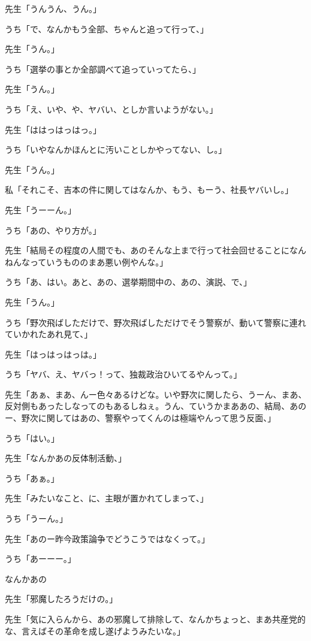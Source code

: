 \documentclass[b5j,twoside,twocolumn]{utarticle}
\begin{document}
\begin{description}
\item 先生「うんうん、うん。」
\item うち「で、なんかもう全部、ちゃんと追って行って、」
\item 先生「うん。」
\item うち「選挙の事とか全部調べて追っていってたら、」
\item 先生「うん。」
\item うち「え、いや、や、ヤバい、としか言いようがない。」
\item 先生「ははっはっはっ。」
\item うち「いやなんかほんとに汚いことしかやってない、し。」
\item 先生「うん。」
\item 私「それこそ、吉本の件に関してはなんか、もう、もーう、社長ヤバいし。」
\item 先生「うーーん。」
\item うち「あの、やり方が。」
\item 先生「結局その程度の人間でも、あのそんな上まで行って社会回せることになんねんなっていうもののまあ悪い例やんな。」
\item うち「あ、はい。あと、あの、選挙期間中の、あの、演説、で、」
\item 先生「うん。」
\item うち「野次飛ばしただけで、野次飛ばしただけでそう警察が、動いて警察に連れていかれたあれ見て、」
\item 先生「はっはっはっは。」
\item うち「ヤバ、え、ヤバっ！って、独裁政治ひいてるやんって。」
\item 先生「あぁ、まあ、んー色々あるけどな。いや野次に関したら、うーん、まあ、反対側もあったしなってのもあるしねぇ。うん、ていうかまああの、結局、あのー、野次に関してはあの、警察やってくんのは極端やんって思う反面、」
\item うち「はい。」
\item 先生「なんかあの反体制活動、」
\item うち「あぁ。」
\item 先生「みたいなこと、に、主眼が置かれてしまって、」
\item うち「うーん。」
\item 先生「あのー昨今政策論争でどうこうではなくって。」
\item うち「あーーー。」
\item なんかあの
\item 先生「邪魔したろうだけの。」
\item 先生「気に入らんから、あの邪魔して排除して、なんかちょっと、まあ共産党的な、言えばその革命を成し遂げようみたいな。」

\end{description}
\end{document}
